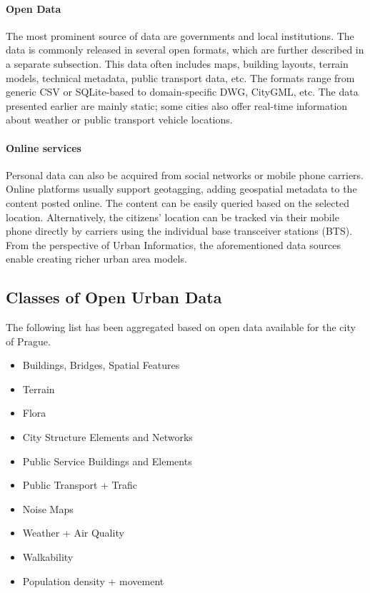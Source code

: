\paragraph{Open Data}
The most prominent source of data are governments and local institutions. The data is commonly released in several open formats, which are further described in a separate subsection. This data often includes maps, building layouts, terrain models, technical metadata, public transport data, etc. The formats range from generic CSV or SQLite-based to domain-specific DWG, CityGML, etc.   
The data presented earlier are mainly static; some cities also offer real-time information about weather or public transport vehicle locations. 

\paragraph{Online services}
Personal data can also be acquired from social networks or mobile phone carriers. Online platforms usually support geotagging, adding geospatial metadata to the content posted online. The content can be easily queried based on the selected location. Alternatively, the citizens' location can be tracked via their mobile phone directly by carriers using the individual base transceiver stations (BTS).  From the perspective of Urban Informatics, the aforementioned data sources enable creating richer urban area models. 

\subsection{Classes of Open Urban Data}
The following list has been aggregated based on open data available for the city of Prague. 

\begin{itemize}
    \item Buildings, Bridges, Spatial Features
    \item Terrain
    \item Flora
    \item City Structure Elements and Networks
    \item Public Service Buildings and Elements
    \item Public Transport + Trafic
    \item Noise Maps
    \item Weather + Air Quality
    \item Walkability
    \item Population density + movement
\end{itemize}

